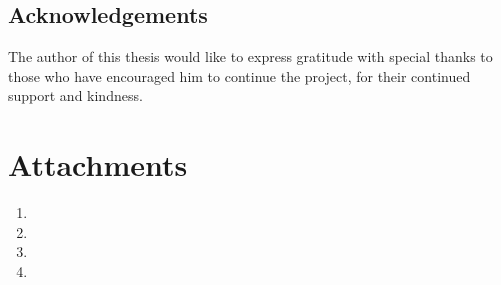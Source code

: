 \documentclass[12pt]{report}
\begin{document}
\section{Acknowledgements}

The author of this thesis would like to express gratitude with special thanks to those who have encouraged him to continue the project, for their continued support and kindness.

\printbibliography[heading=bibintoc]

\listoffigures

\listoftables 

\chapter*{Attachments}
\begin{enumerate}  
	\item 
	\item 
	\item 
	\item
\end{enumerate} 
\end{document}
